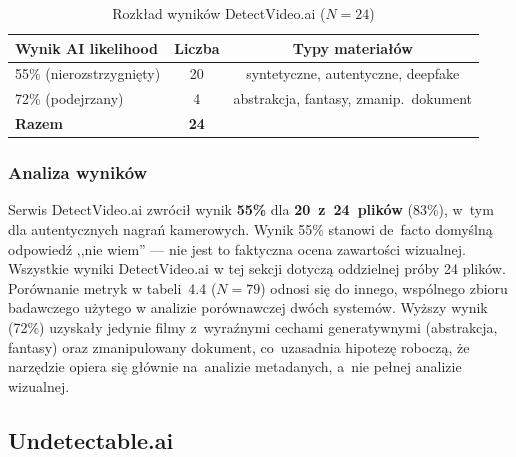 \begin{table}[htbp]
\centering
{\setlength{\tabcolsep}{8pt}\renewcommand{\arraystretch}{1.3}
\caption{Rozk\l{}ad wynik\'{o}w DetectVideo.ai ($N=24$)}
\label{tab:detectvideo_summary}
\small
\begin{tabular}{lcc}
\toprule
\textbf{Wynik AI likelihood} & \textbf{Liczba} & \textbf{Typy materia\l{}\'{o}w} \\
\midrule
55\% (nierozstrzygni\k{e}ty) & 20 & syntetyczne, autentyczne, deepfake \\
72\% (podejrzany)            &  4 & abstrakcja, fantasy, zmanip.\ dokument \\
\midrule
\textbf{Razem} & \textbf{24} & \\
\bottomrule
\end{tabular}}
\end{table}

\subsubsection{Analiza wynik\'{o}w}

Serwis DetectVideo.ai zwr\'{o}ci\l{} wynik \textbf{55\%} dla \textbf{20~z~24~plik\'{o}w}
(83\%), w~tym dla autentycznych nagra\'{n} kamerowych.
Wynik 55\% stanowi de~facto domy\'{s}ln\k{a} odpowied\'{z} ,,nie wiem'' ---
nie jest to faktyczna ocena zawarto\'{s}ci wizualnej.
Wszystkie wyniki DetectVideo.ai w tej sekcji dotyczą oddzielnej próby 24 plików.
Porównanie metryk w tabeli~4.4 ($N=79$) odnosi się do innego, wspólnego zbioru
badawczego użytego w analizie porównawczej dwóch systemów.
Wy\.{z}szy wynik (72\%) uzyska\l{}y jedynie filmy z~wyra\'{z}nymi
cechami generatywnymi (abstrakcja, fantasy) oraz zmanipulowany
dokument, co~uzasadnia hipotezę roboczą, że narzędzie
opiera się głównie na~analizie metadanych,
a~nie pe\l{}nej analizie wizualnej.


\subsection{Undetectable.ai}
\label{sec:undetectable}

